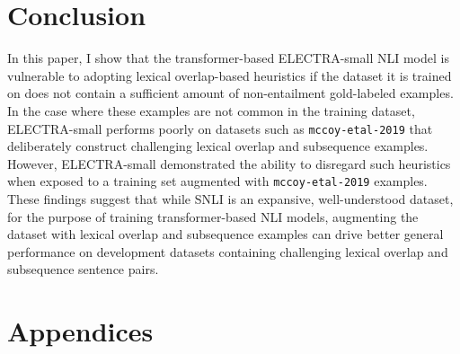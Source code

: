 \documentclass[11pt,a4paper]{article}
\begin{document}
\section{Conclusion}
In this paper, I show that the transformer-based ELECTRA-small NLI model is vulnerable to adopting lexical overlap-based heuristics if the dataset it is trained on does not contain a sufficient amount of non-entailment gold-labeled examples. In the case where these examples are not common in the training dataset, ELECTRA-small performs poorly on datasets such as \texttt{mccoy-etal-2019} that deliberately construct challenging lexical overlap and subsequence examples. However, ELECTRA-small demonstrated the ability to disregard such heuristics when exposed to a training set augmented with \texttt{mccoy-etal-2019} examples. These findings suggest that while SNLI is an expansive, well-understood dataset, for the purpose of training transformer-based NLI models, augmenting the dataset with lexical overlap and subsequence examples can drive better general performance on development datasets containing challenging lexical overlap and subsequence sentence pairs.




\appendix
\section{Appendices}
\label{sec:appendix}
\end{document}
